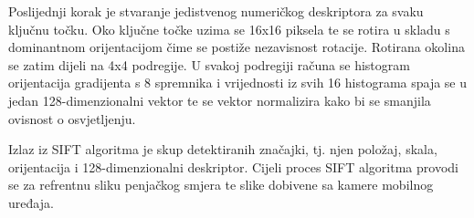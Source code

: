 Poslijednji korak je stvaranje jedistvenog numeričkog deskriptora za svaku ključnu točku. Oko ključne točke uzima se 16x16 piksela te se rotira u skladu s dominantnom orijentacijom čime se postiže nezavisnost rotacije. Rotirana okolina se zatim dijeli na 4x4 podregije. U svakoj podregiji računa se histogram orijentacija gradijenta s 8 spremnika i vrijednosti iz svih 16 histograma spaja se u jedan 128-dimenzionalni vektor te se vektor normalizira kako bi se smanjila ovisnost o osvjetljenju.

Izlaz iz SIFT algoritma je skup detektiranih značajki, tj. njen položaj, skala, orijentacija i 128-dimenzionalni deskriptor. Cijeli proces SIFT algoritma provodi se za refrentnu sliku penjačkog smjera te slike dobivene sa kamere mobilnog uređaja.